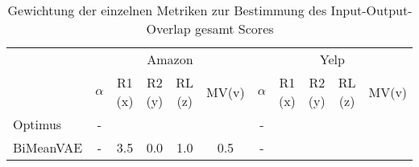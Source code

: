 \begin{table}[h!]
    \centering
    \begin{tabular}{@{}lcccccccccc@{}}
    \toprule
    & \multicolumn{5}{c}{Amazon} & \multicolumn{5}{c}{Yelp} \\ 
             &$\alpha$ & R1 (x)  & R2 (y)  & RL (z) & MV(v)&$\alpha$ &  R1 (x)  & R2 (y)  & RL (z) & MV(v) \\ \midrule
    Optimus   &-&   &   &   &  &  - &   &&   &  \\
    BiMeanVAE &-& 3.5   & 0.0  &  1.0 & 0.5 & -&  &   &   &    \\ \bottomrule
    \end{tabular}
    \caption{Gewichtung der einzelnen Metriken zur Bestimmung des Input-Output-Overlap gesamt Scores}
    \label{weight_mv}
\end{table}

\pagebreak


    
    

